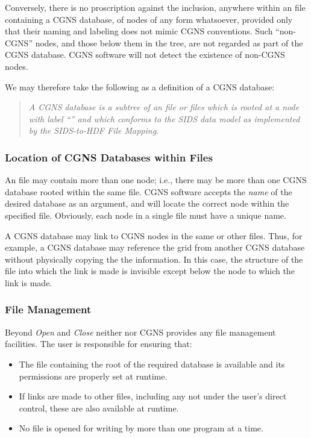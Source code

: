 Conversely, there is no proscription against the inclusion, anywhere
within an \HDF file containing a CGNS database, of nodes of any form
whatsoever, provided only that their naming and labeling does not mimic
CGNS conventions. Such ``non-CGNS'' nodes, and those below them in the \HDF
tree, are not regarded as part of the CGNS database. CGNS software will
not detect the existence of non-CGNS nodes.

We may therefore take the following as a definition of a CGNS database:
\begin{quote}\itshape%
A CGNS database is a subtree of an \HDF file or files which is rooted at
a node with label ``'' and which conforms to the SIDS data
model as implemented by the SIDS-to-HDF File Mapping.
\end{quote}

\subsubsection{Location of CGNS Databases within \HDF Files}

An \HDF file may contain more than one  node; i.e.,
there may be more than one CGNS database rooted within the same \HDF
file.
CGNS software accepts the \emph{name} of the desired database as an
argument, and will locate the correct  node within the
specified \HDF file.
Obviously, each  node in a single \HDF file must have a
unique name.

A CGNS database may link to CGNS nodes in the same or other \HDF
files. Thus, for example, a CGNS database may reference the grid from
another CGNS database without physically copying the the information.
In this case, the structure of the \HDF file into which the link is made
is invisible except below the node to which the link is made.

\subsubsection{File Management}

Beyond \textit{Open} and \textit{Close} neither \HDF nor CGNS provides
any file management facilities. The user is responsible for ensuring
that:

\begin{itemize}
\item The \HDF file containing the root of the required database is
      available and its permissions are properly set at runtime.
\item If links are made to other \HDF files, including any not under the
      user's direct control, these are also available at runtime.
\item No file is opened for writing by more than one program at a time.
\end{itemize}

